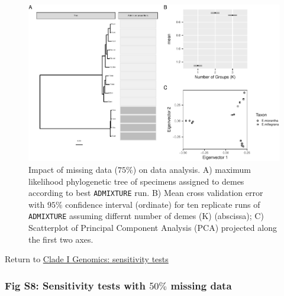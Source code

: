 \documentclass[
  11pt,
]{article}
\begin{document}
\begin{figure}
\includegraphics{Supplementary_Material_files/figure-latex/cladeIgenomicSensitivityAnalysesLargestplots-1} \caption{Impact of missing data ($75\%$) on data analysis. A) maximum likelihood phylogenetic tree of specimens assigned to demes according to best \texttt{ADMIXTURE} run. B) Mean cross validation error with $95\%$ confidence interval (ordinate) for ten replicate runs of \texttt{ADMIXTURE} assuming differnt number of demes (K) (abscissa); C) Scatterplot of Principal Component Analysis (PCA) projected along the first two axes.}\label{fig:cladeIgenomicSensitivityAnalysesLargestplots}
\end{figure}

Return to \protect\hyperlink{sensitivity-tests}{Clade I Genomics: sensitivity tests}
\pagebreak

\hypertarget{fig-s8-sensitivity-tests-with-50-missing-data}{%
\subsubsection{\texorpdfstring{Fig S8: Sensitivity tests with \(50\%\) missing data}{Fig S8: Sensitivity tests with 50\textbackslash\% missing data}}\label{fig-s8-sensitivity-tests-with-50-missing-data}}
\end{document}
